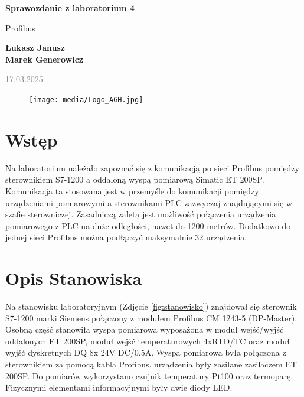 \documentclass{article}
\begin{document}
\begin{titlepage}
    \begin{center}
        \vspace*{1cm}
            
        \Huge
        \textbf{Sprawozdanie z laboratorium 4}
            
        \vspace{0.5cm}
        \LARGE
        Profibus 
            
        \vspace{1.5cm}
            
        \textbf{Łukasz Janusz\\Marek Generowicz}

        \normalsize      
        \textcolor{gray}{17.03.2025}
        \vfill
        \begin{figure}[hb]
            \centering
            \texttt{[image: media/Logo\_AGH.jpg]}
        \end{figure}   
    \end{center}
\end{titlepage}

\section{Wstęp}
Na laboratorium należało zapoznać się z komunikacją po sieci Profibus pomiędzy sterownikiem S7-1200 a oddaloną wyspą pomiarową Simatic ET 200SP. Komunikacja ta stosowana jest w przemyśle do komunikacji pomiędzy urządzeniami pomiarowymi a sterownikami PLC zazwyczaj znajdującymi się w szafie sterowniczej. Zasadniczą zaletą jest możliwość połączenia urządzenia pomiarowego z PLC na duże odległości, nawet do 1200 metrów. Dodatkowo do jednej sieci Profibus można podłączyć maksymalnie 32 urządzenia.

\section{Opis Stanowiska}
Na stanowisku laboratoryjnym (Zdjęcie \ref{fig:stanowisko}) znajdował się sterownik S7-1200 marki Siemens połączony z modułem Profibus CM 1243-5 (DP-Master). Osobną część stanowiła wyspa pomiarowa wyposażona w moduł wejść/wyjść oddalonych ET 200SP, moduł wejść temperaturowych 4xRTD/TC oraz moduł wyjść dyskretnych DQ 8x 24V DC/0.5A. Wyspa pomiarowa była połączona z sterownikiem za pomocą kabla Profibus. urządzenia były zasilane zasilaczem ET 200SP. Do pomiarów wykorzystano czujnik temperatury Pt100 oraz termoparę. Fizycznymi elementami informacyjnymi były dwie diody LED.  
\end{document}
